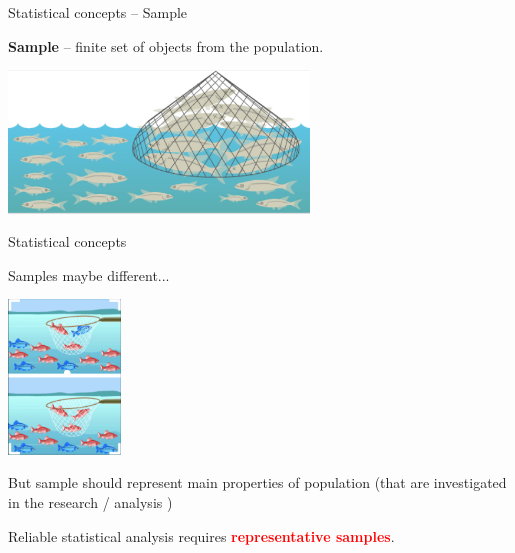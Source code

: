 \documentclass{beamer}
\begin{document}
\begin{frame}
{\centerline{Statistical concepts -- Sample}}


\textbf{Sample} -- finite set of objects from the population.

\begin{center}
\includegraphics[width=8cm]{A2022.IDSEPC.SperimentazioneDeduzione/sam-1.png}
\end{center} 

\end{frame}


\begin{frame}
{\centerline{Statistical concepts }}

Samples maybe different...

\begin{center}
\includegraphics[width=3cm]{A2022.IDSEPC.SperimentazioneDeduzione/fish-pop.png}
\end{center} 

But sample should represent main properties of population (that are investigated in the research / analysis )

Reliable statistical analysis requires  \textcolor{red}{\bf representative samples}.
\end{frame}

\end{document}
